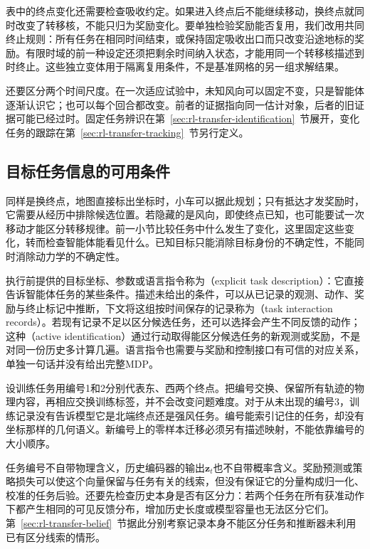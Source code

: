表中的终点变化还需要检查吸收约定。如果进入终点后不能继续移动，换终点就同时改变了转移核，不能只归为奖励变化。要单独检验奖励能否复用，我们改用共同终止规则：所有任务在相同时间结束，或保持固定吸收出口而只改变沿途地标的奖励。有限时域的前一种设定还须把剩余时间纳入状态，才能用同一个转移核描述到时终止。这些独立变体用于隔离复用条件，不是基准网格的另一组求解结果。

还要区分两个时间尺度。在一次适应试验中，未知风向可以固定不变，只是智能体逐渐认识它；也可以每个回合都改变。前者的证据指向同一估计对象，后者的旧证据可能已经过时。固定任务辨识在第~\ref{sec:rl-transfer-identification}~节展开，变化任务的跟踪在第~\ref{sec:rl-transfer-tracking}~节另行定义。

\subsection{目标任务信息的可用条件}
\label{sec:rl-transfer-information}

同样是换终点，地图直接标出坐标时，小车可以据此规划；只有抵达才发奖励时，它需要从经历中排除候选位置。若隐藏的是风向，即使终点已知，也可能要试一次移动才能区分转移规律。前一小节比较任务中什么发生了变化，这里固定这些变化，转而检查智能体能看见什么。已知目标只能消除目标身份的不确定性，不能同时消除动力学的不确定性。

执行前提供的目标坐标、参数或语言指令称为（explicit task description）：它直接告诉智能体任务的某些条件。描述未给出的条件，可以从已记录的观测、动作、奖励与终止标记中推断，下文将这组按时间保存的记录称为（task interaction records）。若现有记录不足以区分候选任务，还可以选择会产生不同反馈的动作；这种（active identification）通过行动取得能区分候选任务的新观测或奖励，不是对同一份历史多计算几遍。语言指令也需要与奖励和控制接口有可信的对应关系，单独一句话并没有给出完整MDP。

设训练任务用编号1和2分别代表东、西两个终点。把编号交换、保留所有轨迹的物理内容，再相应交换训练标签，并不会改变问题难度。对于从未出现的编号3，训练记录没有告诉模型它是北端终点还是强风任务。编号能索引记住的任务，却没有坐标那样的几何语义。新编号上的零样本迁移必须另有描述映射，不能依靠编号的大小顺序。

任务编号不自带物理含义，历史编码器的输出$\bm z_t$也不自带概率含义。奖励预测或策略损失可以使这个向量保留与任务有关的线索，但没有保证它的分量构成归一化、校准的任务后验。还要先检查历史本身是否有区分力：若两个任务在所有获准动作下都产生相同的可见反馈分布，增加历史长度或模型容量也无法区分它们。第~\ref{sec:rl-transfer-belief}~节据此分别考察记录本身不能区分任务和推断器未利用已有区分线索的情形。

